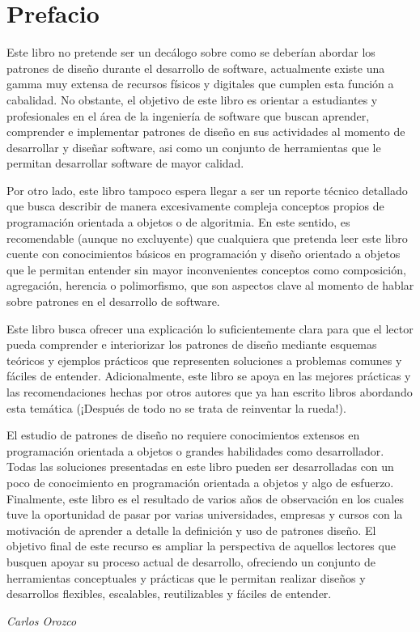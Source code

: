 \chapter*{Prefacio}

Este libro no pretende ser un decálogo sobre como se deberían abordar los patrones de diseño durante el desarrollo de software, actualmente existe una gamma muy extensa de recursos físicos y digitales que cumplen esta función a cabalidad. No obstante, el objetivo de este libro es orientar a estudiantes y profesionales en el área de la ingeniería de software que buscan aprender, comprender e implementar patrones de diseño en sus actividades al momento de desarrollar y diseñar software, asi como un conjunto de herramientas que le permitan desarrollar software de mayor calidad.

Por otro lado, este libro tampoco espera llegar a ser un reporte técnico detallado que busca describir de manera excesivamente compleja conceptos propios de programación orientada a objetos o de algoritmia. En este sentido, es recomendable (aunque no excluyente) que cualquiera que pretenda leer este libro cuente con conocimientos básicos en programación y diseño orientado a objetos que le permitan entender sin mayor inconvenientes conceptos como composición, agregación, herencia o polimorfismo, que son aspectos clave al momento de hablar sobre patrones en el desarrollo de software.

Este libro busca ofrecer una explicación lo suficientemente clara para que el lector pueda comprender e interiorizar los patrones de diseño mediante esquemas teóricos y ejemplos prácticos que representen soluciones a problemas comunes y fáciles de entender. Adicionalmente, este libro se apoya en las mejores prácticas y las recomendaciones hechas por otros autores que ya han escrito libros abordando esta temática (¡Después de todo no se trata de reinventar la rueda!).

El estudio de patrones de diseño no requiere conocimientos extensos en programación orientada a objetos o grandes habilidades como desarrollador. Todas las soluciones presentadas en este libro pueden ser desarrolladas con un poco de conocimiento en programación orientada a objetos y algo de esfuerzo. Finalmente, este libro es el resultado de varios años de observación en los cuales tuve la oportunidad de pasar por varias universidades, empresas y cursos con la motivación de aprender a detalle la definición y uso de patrones diseño. El objetivo final de este recurso es ampliar la perspectiva de aquellos lectores que busquen apoyar su proceso actual de desarrollo, ofreciendo un conjunto de herramientas conceptuales y prácticas que le permitan realizar diseños y desarrollos flexibles, escalables, reutilizables y fáciles de entender.

\begin{flushright}
	\textit{Carlos Orozco}
\end{flushright}
